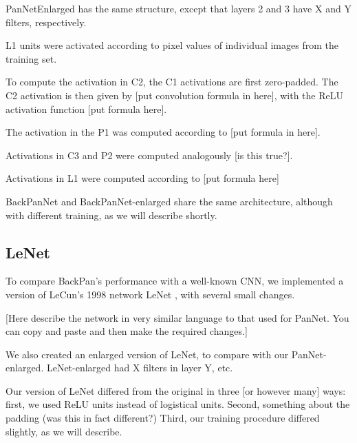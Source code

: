 PanNetEnlarged has the same structure, except that layers 2 and 3 have X and Y filters, respectively.

L1 units were activated according to pixel values of individual  images from the training set.

To compute the activation in C2, the C1 activations are first zero-padded. The C2 activation is then given by [put convolution formula in here], with the ReLU activation function [put formula here].

The activation in the P1 was computed according to [put formula in here].

Activations in C3 and P2 were computed analogously [is this true?].

Activations in L1 were computed according to [put formula here]

BackPanNet and BackPanNet-enlarged share the same architecture, although with different training, as we will describe shortly.

\subsection{LeNet}

To compare BackPan's performance with a well-known CNN, we implemented a version of LeCun's 1998 network LeNet \cite{lecun_gradient-based_1998}, with several small changes.

[Here describe the network in very similar language to that used for PanNet. You can copy and paste and then make the required changes.]

We also created an enlarged version of LeNet, to compare with our PanNet-enlarged. LeNet-enlarged had X filters in layer Y, etc.

Our version of LeNet differed from the original in three [or however many] ways: first, we used ReLU units instead of logistical units. Second, something about the padding (was this in fact different?) Third, our training procedure differed slightly, as we will describe.



